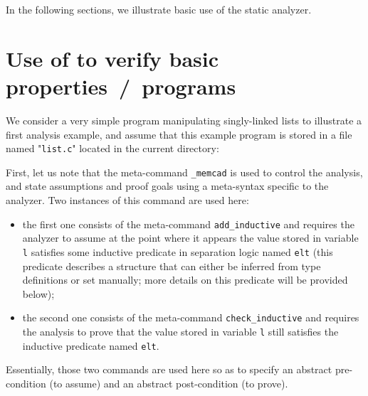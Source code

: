 In the following sections, we illustrate basic use of the \memcad
static analyzer.

\section{Use of \memcad to verify basic properties~/~programs}
\label{sec:usage-example}
We consider a very simple program manipulating singly-linked lists to
illustrate a first analysis example, and assume that this example
program is stored in a file named "\texttt{list.c}" located in the
current directory:

First, let us note that the meta-command \verb#_memcad# is used to
control the analysis, and state assumptions and proof goals using a
meta-syntax specific to the analyzer.
Two instances of this command are used here:
\begin{itemize}
\item the first one consists of the meta-command \verb#add_inductive#
  and requires the analyzer to assume at the point where it appears the
  value stored in variable \verb#l# satisfies some inductive predicate in
  separation logic named \verb#elt# (this predicate describes a structure
  that can either be inferred from type definitions or set manually; more
  details on this predicate will be provided below);
\item the second one consists of the meta-command \verb#check_inductive#
  and requires the analysis to prove that the value stored in variable
  \verb#l# still satisfies the inductive predicate named \verb#elt#.
\end{itemize}
Essentially, those two commands are used here so as to specify an abstract
pre-condition (to assume) and an abstract post-condition (to prove).

